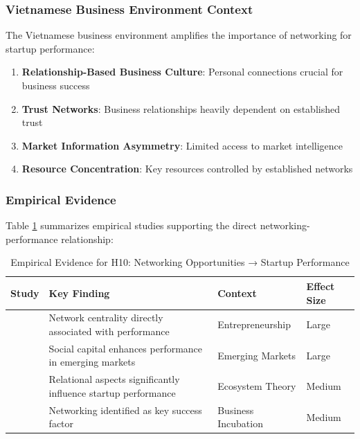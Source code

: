 \documentclass[../Main.tex]{subfiles}
\begin{document}
    \subsubsection{Vietnamese Business Environment Context}
    The Vietnamese business environment amplifies the importance of networking for startup performance:

    \begin{enumerate}
        \item \textbf{Relationship-Based Business Culture}: Personal connections crucial for business success
        \item \textbf{Trust Networks}: Business relationships heavily dependent on established trust
        \item \textbf{Market Information Asymmetry}: Limited access to market intelligence
        \item \textbf{Resource Concentration}: Key resources controlled by established networks
    \end{enumerate}

    \subsubsection{Empirical Evidence}
    Table \ref{tab:h10_evidence} summarizes empirical studies supporting the direct networking-performance relationship:

    \begin{table}[H]
        \centering
        \caption{Empirical Evidence for H10: Networking Opportunities → Startup Performance}
        \label{tab:h10_evidence}
        \begin{tabular}{|p{3cm}|p{4cm}|p{3cm}|p{2cm}|}
            \hline
            \textbf{Study} & \textbf{Key Finding} & \textbf{Context} & \textbf{Effect Size} \\
            \hline
            \cite{stam2008entrepreneurial} & Network centrality directly associated with performance & Entrepreneurship & Large \\
            \hline
            \cite{batjargal2003social} & Social capital enhances performance in emerging markets & Emerging Markets & Large \\
            \hline
            \cite{spigel2017relational} & Relational aspects significantly influence startup performance & Ecosystem Theory & Medium \\
            \hline
            \cite{theodorakopoulos2014business} & Networking identified as key success factor & Business Incubation & Medium \\
            \hline
        \end{tabular}
    \end{table}
\end{document}
